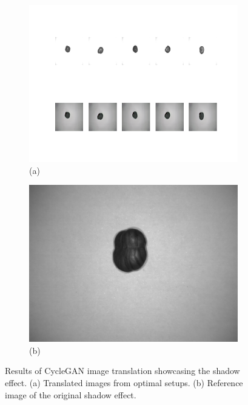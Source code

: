 \documentclass[12pt,DIV14,BCOR12mm,a4paper,footinclude=false,headinclude,parskip=half-,twoside,openright,cleardoublepage=empty,toc=index,bibliography=totoc,listof=totoc]{scrreprt}
\numberwithin{equation}{chapter}
\begin{document}
\begin{figure}
    \centering
    \begin{subfigure}[b]{0.85\textwidth}
        \centering
        \includegraphics[width=\textwidth]{../media/Shadow.png}
        \caption*{(a)}
    \end{subfigure}
    \hfill
    \begin{subfigure}[b]{0.25\textwidth}
        \centering
        \includegraphics[width=\textwidth]{../media/shadow_real.png}
        \caption*{(b)}
    \end{subfigure}
    \caption{Results of CycleGAN image translation showcasing the shadow effect. (a) Translated images from optimal setups. (b) Reference image of the original shadow effect.}
    \label{fig:shadow_effect_result}
\end{figure}
\end{document}
